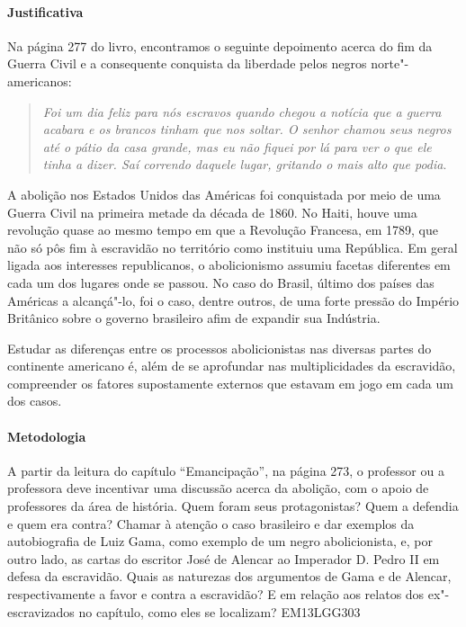 \documentclass[11pt]{extarticle}
\begin{document}
\paragraph{Justificativa} Na página 277 do livro, encontramos o seguinte depoimento
acerca do fim da Guerra Civil e a consequente conquista da liberdade pelos negros norte"-americanos:

\begin{quote}
\emph{Foi um dia feliz para nós escravos quando chegou a notícia que a guerra acabara 
e os brancos tinham que nos soltar. O senhor chamou seus negros até o pátio da casa
grande, mas eu não fiquei por lá para ver o que ele tinha
a dizer. Saí correndo daquele lugar, gritando o mais alto que podia}.
\end{quote}

A abolição nos Estados Unidos das Américas foi conquistada por meio de uma Guerra Civil na
primeira metade da década de 1860. No Haiti, houve uma revolução quase ao mesmo tempo
em que a Revolução Francesa, em 1789, que não só pôs fim à escravidão no território
como instituiu uma República. Em geral ligada aos interesses republicanos, 
o abolicionismo assumiu facetas diferentes em cada um dos lugares onde se 
passou. No caso do Brasil, último dos países das Américas a alcançá"-lo,
foi o caso, dentre outros, de uma forte pressão do Império Britânico sobre 
o governo brasileiro afim de expandir sua Indústria.

Estudar as diferenças entre os processos abolicionistas nas diversas
partes do continente americano é, além de se aprofundar nas multiplicidades
da escravidão, compreender os fatores supostamente externos que estavam em jogo 
em cada um dos casos.

\paragraph{Metodologia} A partir da leitura do capítulo ``Emancipação'', na página 273, 
o professor ou a professora deve incentivar uma discussão acerca da abolição, com o apoio
de professores da área de história. 
Quem foram seus protagonistas? Quem a defendia e quem era contra? 
Chamar à atenção o caso brasileiro e dar exemplos da autobiografia de Luiz Gama,
como exemplo de um negro abolicionista, e, por outro lado, as cartas do escritor 
José de Alencar ao Imperador D. Pedro II em defesa da escravidão. 
Quais as naturezas dos argumentos de Gama e de Alencar, respectivamente a 
favor e contra a escravidão? E em relação aos relatos dos ex"-escravizados no capítulo, 
como eles se localizam?
EM13LGG303 %
\end{document}
